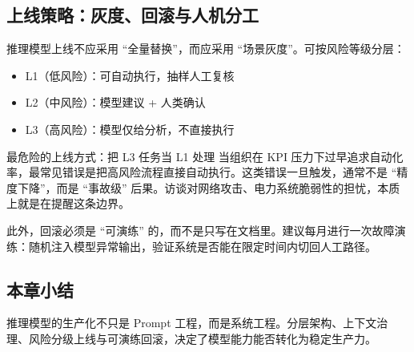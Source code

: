 \subsection{上线策略：灰度、回滚与人机分工}

推理模型上线不应采用 ``全量替换''，而应采用 ``场景灰度''。可按风险等级分层：
\begin{itemize}
    \item L1（低风险）：可自动执行，抽样人工复核
    \item L2（中风险）：模型建议 + 人类确认
    \item L3（高风险）：模型仅给分析，不直接执行
\end{itemize}

\begin{warningbox}{最危险的上线方式：把 L3 任务当 L1 处理}
当组织在 KPI 压力下过早追求自动化率，最常见错误是把高风险流程直接自动执行。这类错误一旦触发，通常不是 ``精度下降''，而是 ``事故级'' 后果。访谈对网络攻击、电力系统脆弱性的担忧，本质上就是在提醒这条边界。
\end{warningbox}

此外，回滚必须是 ``可演练'' 的，而不是只写在文档里。建议每月进行一次故障演练：随机注入模型异常输出，验证系统是否能在限定时间内切回人工路径。

\subsection{本章小结}

推理模型的生产化不只是 Prompt 工程，而是系统工程。分层架构、上下文治理、风险分级上线与可演练回滚，决定了模型能力能否转化为稳定生产力。

